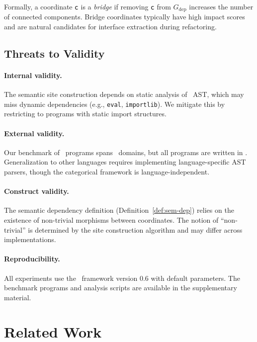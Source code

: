 \documentclass[11pt]{article}
\begin{document}
Formally, a coordinate $\mathsf{c}$ is a \emph{bridge} if removing $\mathsf{c}$
from $G_{\mathrm{dep}}$ increases the number of connected components.
Bridge coordinates typically have high impact scores and are natural
candidates for interface extraction during refactoring.

\subsection{Threats to Validity}\label{sec:threats}

\paragraph{Internal validity.}
The semantic site construction depends on static analysis of \Python\ AST,
which may miss dynamic dependencies (e.g., \texttt{eval},
\texttt{importlib}).  We mitigate this by restricting to programs with
static import structures.

\paragraph{External validity.}
Our benchmark of \compTotalPrograms\ programs spans \expDomainCount\
domains, but all programs are written in \Python.  Generalization to other
languages requires implementing language-specific AST parsers, though the
categorical framework is language-independent.

\paragraph{Construct validity.}
The semantic dependency definition (Definition~\ref{def:sem-dep}) relies on
the existence of non-trivial morphisms between coordinates.  The notion of
``non-trivial'' is determined by the site construction algorithm and may
differ across implementations.

\paragraph{Reproducibility.}
All experiments use the \JuGeo\ framework version 0.6 with default
parameters.  The benchmark programs and analysis scripts are available in
the supplementary material.

\section{Related Work}\label{sec:related}
\end{document}
